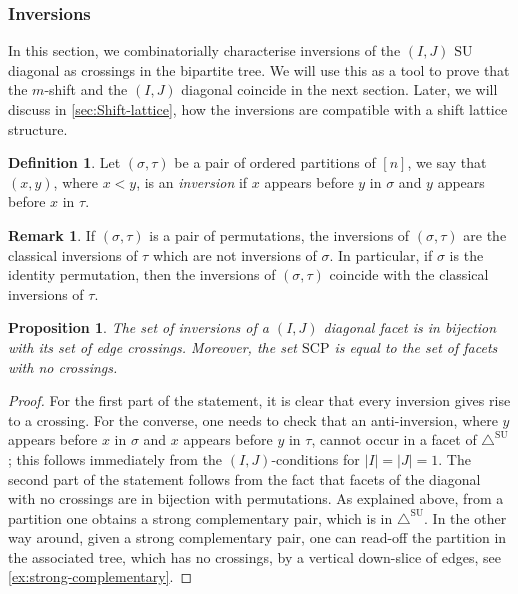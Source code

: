 \documentclass{amsart}
\newtheorem{proposition}[theorem]{Proposition}
\theoremstyle{definition}
\newtheorem{definition}[theorem]{Definition}
\newtheorem{remark}[theorem]{Remark}
\newcommand{\SU}{\mathrm{SU}}
\newcommand{\SUD}{\triangle^{\mathrm{SU}}}
\newcommand{\SCP}{\mathrm{SCP}}
\begin{document}

\subsubsection{Inversions}

In this section, we combinatorially characterise inversions of the $(I,J)$ $\SU$ diagonal as crossings in the bipartite tree.
We will use this as a tool to prove that the $m$-shift and the $(I,J)$ diagonal coincide in the next section.
Later, we will discuss in \cref{sec:Shift-lattice}, how the inversions are compatible with a shift lattice structure.

\begin{definition}
Let $(\sigma,\tau)$ be a pair of ordered partitions of $[n]$, we say that $(x,y)$, where $x<y$, is an \emph{inversion} if $x$ appears before $y$ in $\sigma$ and $y$ appears before $x$ in $\tau$. 
\end{definition}

\begin{remark}
    If $(\sigma,\tau)$ is a pair of permutations, the inversions of $(\sigma,\tau)$ are the classical inversions of $\tau$ which are not inversions of $\sigma$. 
    In particular, if $\sigma$ is the identity permutation, then the inversions of $(\sigma,\tau)$ coincide with the classical inversions of $\tau$. 
\end{remark}

\begin{proposition}
\label{p:crossings}
The set of inversions of a $(I,J)$ diagonal facet is in bijection with its set of edge crossings. 
Moreover, the set $\SCP$ is equal to the set of facets with no crossings.
\end{proposition}

\begin{proof}
For the first part of the statement, it is clear that every inversion gives rise to a crossing. 
For the converse, one needs to check that an anti-inversion, where $y$ appears before $x$ in $\sigma$ and $x$ appears before $y$ in $\tau$, cannot occur in a facet of $\SUD$; this follows immediately from the $(I,J)$-conditions for $|I|=|J|=1$. 
The second part of the statement follows from the fact that facets of the diagonal with no crossings are in bijection with permutations.
As explained above, from a partition one obtains a strong complementary pair, which is in $\SUD$. 
In the other way around, given a strong complementary pair, one can read-off the partition in the associated tree, which has no crossings, by a vertical down-slice of edges, see \cref{ex:strong-complementary}.
\end{proof}
\end{document}
